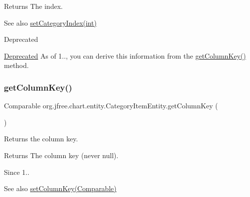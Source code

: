 \begin{DoxyReturn}{Returns}
The index.
\end{DoxyReturn}
\begin{DoxySeeAlso}{See also}
\mbox{\hyperlink{classorg_1_1jfree_1_1chart_1_1entity_1_1_category_item_entity_af1892446208864ef07d1954e8c32b4cb}{set\+Category\+Index(int)}}
\end{DoxySeeAlso}
\begin{DoxyRefDesc}{Deprecated}
\item[\mbox{\hyperlink{deprecated__deprecated000045}{Deprecated}}]As of 1.., you can derive this information from the \mbox{\hyperlink{classorg_1_1jfree_1_1chart_1_1entity_1_1_category_item_entity_a8c5694b51e2b552e71fc31ef3a291b80}{get\+Column\+Key()}} method. \end{DoxyRefDesc}
\mbox{\label{classorg_1_1jfree_1_1chart_1_1entity_1_1_category_item_entity_a8c5694b51e2b552e71fc31ef3a291b80}} 
\subsubsection{\texorpdfstring{get\+Column\+Key()}{getColumnKey()}}
{\footnotesize\ttfamily Comparable org.\+jfree.\+chart.\+entity.\+Category\+Item\+Entity.\+get\+Column\+Key (\begin{DoxyParamCaption}{ }\end{DoxyParamCaption})}

Returns the column key.

\begin{DoxyReturn}{Returns}
The column key (never {\ttfamily null}).
\end{DoxyReturn}
\begin{DoxySince}{Since}
1..
\end{DoxySince}
\begin{DoxySeeAlso}{See also}
\mbox{\hyperlink{classorg_1_1jfree_1_1chart_1_1entity_1_1_category_item_entity_ab91210c9acc7d24595eca4a5a414b85d}{set\+Column\+Key(\+Comparable)}} 
\end{DoxySeeAlso}
\mbox{\label{classorg_1_1jfree_1_1chart_1_1entity_1_1_category_item_entity_a17dc2014d109ea945c31413476db9eff}} 
